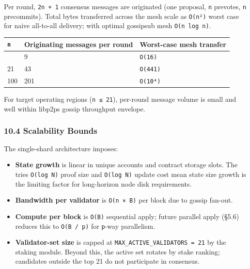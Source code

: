 \documentclass[11pt,a4paper]{article}
\providecommand{\tightlist}{\setlength{\itemsep}{0pt}\setlength{\parskip}{0pt}}
\begin{document}
Per round, \texttt{2n\ +\ 1} consensus messages are originated (one
proposal, \texttt{n} prevotes, \texttt{n} precommits). Total bytes
transferred across the mesh scale as \texttt{O(n²)} worst case for naive
all-to-all delivery; with optimal gossipsub mesh \texttt{O(n\ log\ n)}.

\begin{longtable}[]{@{}lll@{}}
\toprule\noalign{}
\texttt{n} & Originating messages per round & Worst-case mesh
transfer \\
\midrule\noalign{}
\endhead
\bottomrule\noalign{}
\endlastfoot
4 & 9 & \texttt{O(16)} \\
21 & 43 & \texttt{O(441)} \\
100 & 201 & \texttt{O(10⁴)} \\
\end{longtable}

For target operating regions (\texttt{n\ ≤\ 21}), per-round message
volume is small and well within libp2p\textquotesingle s gossip
throughput envelope.

\hypertarget{104-scalability-bounds}{%
\subsubsection{10.4 Scalability Bounds}\label{104-scalability-bounds}}

The single-shard architecture imposes:

\begin{itemize}
\tightlist
\item
  \textbf{State growth} is linear in unique accounts and contract
  storage slots. The trie\textquotesingle s \texttt{O(log\ N)} proof
  size and \texttt{O(log\ N)} update cost mean state size growth is the
  limiting factor for long-horizon node disk requirements.
\item
  \textbf{Bandwidth per validator} is
  \texttt{O(n\ ×\ \textbar{}B\textbar{})} per block due to gossip
  fan-out.
\item
  \textbf{Compute per block} is \texttt{O(\textbar{}B\textbar{})}
  sequential apply; future parallel apply (§5.6) reduces this to
  \texttt{O(\textbar{}B\textbar{}\ /\ p)} for \texttt{p}-way
  parallelism.
\item
  \textbf{Validator-set size} is capped at
  \texttt{MAX\_ACTIVE\_VALIDATORS\ =\ 21} by the staking module. Beyond
  this, the active set rotates by stake ranking; candidates outside the
  top 21 do not participate in consensus.
\end{itemize}
\end{document}
